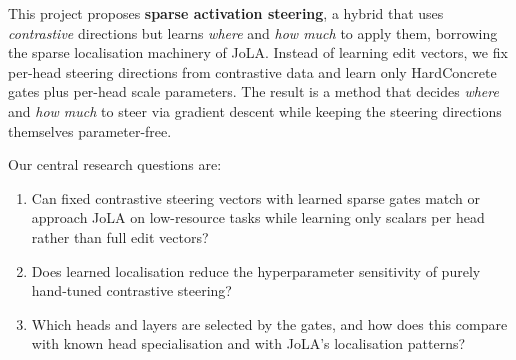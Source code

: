 This project proposes \textbf{sparse activation steering}, a hybrid that uses \emph{contrastive} directions but learns \emph{where} and \emph{how much} to apply them, borrowing the sparse localisation machinery of JoLA. Instead of learning edit vectors, we fix per-head steering directions from contrastive data and learn only HardConcrete gates plus per-head scale parameters. The result is a method that decides \emph{where} and \emph{how much} to steer via gradient descent while keeping the steering directions themselves parameter-free.

Our central research questions are:
\begin{enumerate}
    \item Can fixed contrastive steering vectors with learned sparse gates match or approach JoLA on low-resource tasks while learning only scalars per head rather than full edit vectors?
    \item Does learned localisation reduce the hyperparameter sensitivity of purely hand-tuned contrastive steering?
    \item Which heads and layers are selected by the gates, and how does this compare with known head specialisation and with JoLA's localisation patterns?
\end{enumerate}
